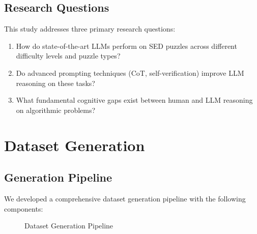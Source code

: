 \documentclass[11pt,a4paper]{article}
\begin{document}
\subsection{Research Questions}

This study addresses three primary research questions:

\begin{enumerate}
    \item[\textbf{RQ1}] How do state-of-the-art LLMs perform on SED puzzles across different difficulty levels and puzzle types?
    \item[\textbf{RQ2}] Do advanced prompting techniques (CoT, self-verification) improve LLM reasoning on these tasks?
    \item[\textbf{RQ3}] What fundamental cognitive gaps exist between human and LLM reasoning on algorithmic problems?
\end{enumerate}

\section{Dataset Generation}

\subsection{Generation Pipeline}

We developed a comprehensive dataset generation pipeline with the following components:

\begin{figure}[H]
\centering
{}
\caption{Dataset Generation Pipeline}
\end{figure}
\end{document}
